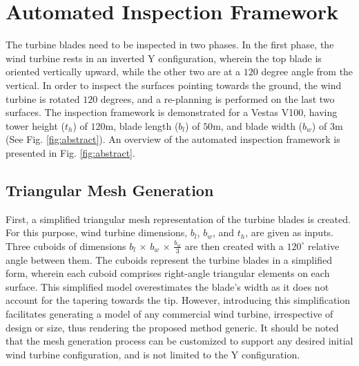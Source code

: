 \section{Automated Inspection Framework}
\label{sec:methodology}
The turbine blades need to be inspected in two phases. In the first phase, the wind turbine rests in an inverted Y configuration, wherein the top blade is oriented vertically upward, while the other two are at a $120$ degree angle from the vertical. In order to inspect the surfaces pointing towards the ground, the wind turbine is rotated $120$ degrees, and a re-planning is performed on the last two surfaces. The inspection framework is demonstrated for a Vestas V100, having tower height ($t_h$) of $120$m, blade length ($b_l$) of $50$m, and blade width ($b_w$) of $3$m (See Fig. \ref{fig:abstract}).
An overview of the automated inspection framework is presented in Fig. \ref{fig:abstract}.



\subsection{Triangular Mesh Generation}



First, a simplified triangular mesh representation of the turbine blades is created. For this purpose,  wind turbine dimensions, $b_l$, $b_w$, and $t_h$, are given as inputs. Three cuboids of dimensions $b_l$ $\times$ $b_w$ $\times$ $\frac{b_w}{3}$ are then created with a $120^{\circ}$ relative angle between them. The cuboids represent the turbine blades in a simplified form, wherein each cuboid comprises right-angle triangular elements on each surface.  This simplified model overestimates the blade's width as it does not account for the tapering towards the tip. However, introducing this simplification facilitates generating a model of any commercial wind turbine, irrespective of design or size, thus rendering the proposed method generic. It should be noted that the mesh generation process can be customized to support any desired initial wind turbine configuration, and is not limited to the Y configuration. %

